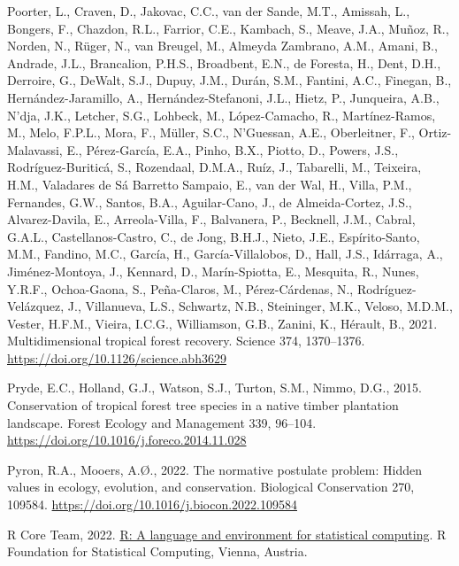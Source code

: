 \documentclass[
  12pt,
]{article}
\newlength{\cslhangindent}
\newlength{\cslentryspacingunit} %
\newenvironment{CSLReferences}[2] %
 {%
  \setlength{\parindent}{0pt}
  \ifodd #1
  \let\oldpar\par
  \def\par{\hangindent=\cslhangindent\oldpar}
  \fi
  \setlength{\parskip}{#2\cslentryspacingunit}
 }%
 {}
\begin{document}
\begin{CSLReferences}{1}{0}
\leavevmode{}%
Poorter, L., Craven, D., Jakovac, C.C., van der Sande, M.T., Amissah, L., Bongers, F., Chazdon, R.L., Farrior, C.E., Kambach, S., Meave, J.A., Muñoz, R., Norden, N., Rüger, N., van Breugel, M., Almeyda Zambrano, A.M., Amani, B., Andrade, J.L., Brancalion, P.H.S., Broadbent, E.N., de Foresta, H., Dent, D.H., Derroire, G., DeWalt, S.J., Dupuy, J.M., Durán, S.M., Fantini, A.C., Finegan, B., Hernández-Jaramillo, A., Hernández-Stefanoni, J.L., Hietz, P., Junqueira, A.B., N'dja, J.K., Letcher, S.G., Lohbeck, M., López-Camacho, R., Martínez-Ramos, M., Melo, F.P.L., Mora, F., Müller, S.C., N'Guessan, A.E., Oberleitner, F., Ortiz-Malavassi, E., Pérez-García, E.A., Pinho, B.X., Piotto, D., Powers, J.S., Rodríguez-Buriticá, S., Rozendaal, D.M.A., Ruíz, J., Tabarelli, M., Teixeira, H.M., Valadares de Sá Barretto Sampaio, E., van der Wal, H., Villa, P.M., Fernandes, G.W., Santos, B.A., Aguilar-Cano, J., de Almeida-Cortez, J.S., Alvarez-Davila, E., Arreola-Villa, F., Balvanera, P., Becknell, J.M., Cabral, G.A.L., Castellanos-Castro, C., de Jong, B.H.J., Nieto, J.E., Espírito-Santo, M.M., Fandino, M.C., García, H., García-Villalobos, D., Hall, J.S., Idárraga, A., Jiménez-Montoya, J., Kennard, D., Marín-Spiotta, E., Mesquita, R., Nunes, Y.R.F., Ochoa-Gaona, S., Peña-Claros, M., Pérez-Cárdenas, N., Rodríguez-Velázquez, J., Villanueva, L.S., Schwartz, N.B., Steininger, M.K., Veloso, M.D.M., Vester, H.F.M., Vieira, I.C.G., Williamson, G.B., Zanini, K., Hérault, B., 2021. Multidimensional tropical forest recovery. Science 374, 1370--1376. \url{https://doi.org/10.1126/science.abh3629}

\leavevmode{}%
Pryde, E.C., Holland, G.J., Watson, S.J., Turton, S.M., Nimmo, D.G., 2015. Conservation of tropical forest tree species in a native timber plantation landscape. Forest Ecology and Management 339, 96--104. \url{https://doi.org/10.1016/j.foreco.2014.11.028}

\leavevmode{}%
Pyron, R.A., Mooers, A.Ø., 2022. The normative postulate problem: {Hidden} values in ecology, evolution, and conservation. Biological Conservation 270, 109584. \url{https://doi.org/10.1016/j.biocon.2022.109584}

\leavevmode{}%
R Core Team, 2022. \href{https://www.R-project.org/}{R: A language and environment for statistical computing}. R Foundation for Statistical Computing, Vienna, Austria.


\end{CSLReferences}
\end{document}
